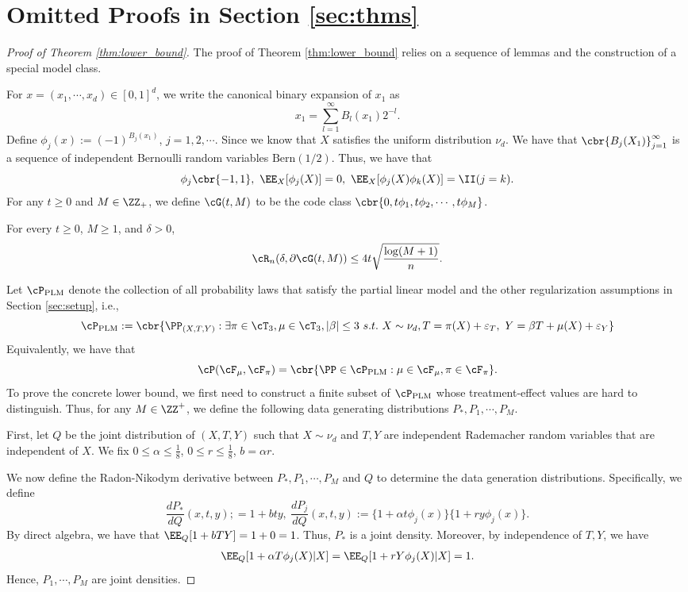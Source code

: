 \documentclass[11pt]{article}
\begin{document}


\appendix
\clearpage
\section{Omitted Proofs in Section \ref{sec:thms}}\label{app:proofs_thms}
\begin{proof}[Proof of Theorem \ref{thm:lower_bound}]
The proof of Theorem \ref{thm:lower_bound} relies on a sequence of lemmas and the construction of a special model class.

For $x=(x_1,\cdots,x_d)\in[0,1]^d$, we write the canonical binary expansion of $x_1$ as
\[
x_1=\sum_{l=1}^{\infty}B_l(x_1)2^{-l}.
\]
Define $\phi_j(x):=(-1)^{B_j(x_1)}$, $j=1,2,\cdots$.
Since we know that $X$ satisfies the uniform distribution $\nu_d$. We have that $\cbr{B_j(X_1)}_{j=1}^{\infty}$ is a sequence of independent Bernoulli random variables $\text{Bern}(1/2)$. Thus, we have that 
\[
\phi_j\cbr{-1,1},\ \EE_X[\phi_j(X)]=0,\ \EE_X[\phi_j(X)\phi_k(X)]=\II(j=k).
\]
For any $t\ge 0$ and $M\in\ZZ_+$, we define $\cG(t,M)$ to be the code class $\cbr{0,t\phi_1,t\phi_2,\cdots,t\phi_M}$.
\begin{lemma}\label{lem:Rad_com_G(t,M)}
    For every $t\ge 0$, $M\ge 1$, and $\delta>0$,
    \[
    \cR_n(\delta,\partial \cG(t,M))\le 4t\sqrt{\frac{\log(M+1)}{n}}.
    \]
\end{lemma}
Let $\cP_{\text{PLM}}$ denote the collection of all probability laws that satisfy the partial linear model and the other regularization assumptions in Section \ref{sec:setup}, i.e.,
\[
\cP_{\text{PLM}}:=\cbr{\PP_{(X,T,Y)}: \exists \pi\in\cT_3,\mu\in\cT_3,|\beta|\le 3\ s.t.\ X\sim\nu_d, T=\pi(X)+\varepsilon_T,\ Y=\beta T+\mu(X)+\varepsilon_Y}
\]
Equivalently, we have that 
\[
\cP(\cF_{\mu},\cF_{\pi})=\cbr{\PP\in \cP_{\text{PLM}}: \mu\in\cF_{\mu},\pi\in\cF_{\pi}}.
\]
To prove the concrete lower bound, we first need to construct a finite subset of $\cP_{\text{PLM}}$ whose treatment-effect values are hard to distinguish. Thus, for any $M\in\ZZ^+$, we define the following data generating distributions $P_*,P_1,\cdots,P_M$.

First, let $Q$ be the joint distribution of $(X,T,Y)$ such that $X\sim\nu_d$ and $T,Y$ are independent Rademacher random variables that are independent of $X$. We fix $0\le\alpha\le\frac{1}{8}$, $0\le r\le\frac{1}{8}$, $b=\alpha r$.

We now define the Radon-Nikodym derivative between $P_*,P_1,\cdots,P_M$ and $Q$ to determine the data generation distributions.
Specifically, we define 
\[
\frac{dP_*}{dQ}(x,t,y);=1+bty,\ \frac{dP_j}{dQ}(x,t,y):=\{1+\alpha t\phi_j(x)\}\{1+ry\phi_j(x)\}.
\]
By direct algebra, we have that $\EE_Q[1+bTY]=1+0=1$.
Thus, $P_*$ is a joint density. Moreover, by independence of $T,Y$, we have
\begin{align*}
    \EE_Q[1+\alpha T\phi_j(X)|X]=\EE_Q[1+rY\phi_j(X)|X]=1.
\end{align*}
Hence, $P_1,\cdots,P_M$ are joint densities.


\end{proof}
\end{document}
